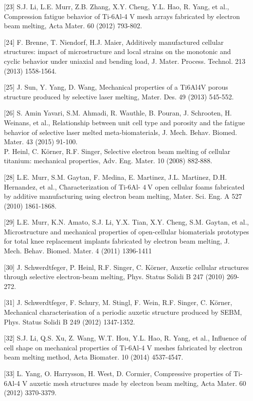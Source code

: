 \documentclass[10pt]{article}
\begin{document}
[23] S.J. Li, L.E. Murr, Z.B. Zhang, X.Y. Cheng, Y.L. Hao, R. Yang, et al., Compression fatigue behavior of Ti-6Al-4 V mesh arrays fabricated by electron beam melting, Acta Mater. 60 (2012) 793-802.

[24] F. Brenne, T. Niendorf, H.J. Maier, Additively manufactured cellular structures: impact of microstructure and local strains on the monotonic and cyclic behavior under uniaxial and bending load, J. Mater. Process. Technol. 213 (2013) 1558-1564.

[25] J. Sun, Y. Yang, D. Wang, Mechanical properties of a Ti6Al4V porous structure produced by selective laser melting, Mater. Des. 49 (2013) 545-552.

[26] S. Amin Yavari, S.M. Ahmadi, R. Wauthle, B. Pouran, J. Schrooten, H. Weinans, et al., Relationship between unit cell type and porosity and the fatigue behavior of selective laser melted meta-biomaterials, J. Mech. Behav. Biomed. Mater. 43 (2015) 91-100.\\
[27] P. Heinl, C. Körner, R.F. Singer, Selective electron beam melting of cellular titanium: mechanical properties, Adv. Eng. Mater. 10 (2008) 882-888.

[28] L.E. Murr, S.M. Gaytan, F. Medina, E. Martinez, J.L. Martinez, D.H. Hernandez, et al., Characterization of Ti-6Al- $4 \mathrm{~V}$ open cellular foams fabricated by additive manufacturing using electron beam melting, Mater. Sci. Eng. A 527 (2010) 1861-1868.

[29] L.E. Murr, K.N. Amato, S.J. Li, Y.X. Tian, X.Y. Cheng, S.M. Gaytan, et al., Microstructure and mechanical properties of open-cellular biomaterials prototypes for total knee replacement implants fabricated by electron beam melting, J. Mech. Behav. Biomed. Mater. 4 (2011) 1396-1411

[30] J. Schwerdtfeger, P. Heinl, R.F. Singer, C. Körner, Auxetic cellular structures through selective electron-beam melting, Phys. Status Solidi B 247 (2010) 269-272.

[31] J. Schwerdtfeger, F. Schury, M. Stingl, F. Wein, R.F. Singer, C. Körner, Mechanical characterisation of a periodic auxetic structure produced by SEBM, Phys. Status Solidi B 249 (2012) 1347-1352.

[32] S.J. Li, Q.S. Xu, Z. Wang, W.T. Hou, Y.L. Hao, R. Yang, et al., Influence of cell shape on mechanical properties of Ti-6Al-4 V meshes fabricated by electron beam melting method, Acta Biomater. 10 (2014) 4537-4547.

[33] L. Yang, O. Harrysson, H. West, D. Cormier, Compressive properties of Ti-6Al-4 V auxetic mesh structures made by electron beam melting, Acta Mater. 60 (2012) 3370-3379.
\end{document}

